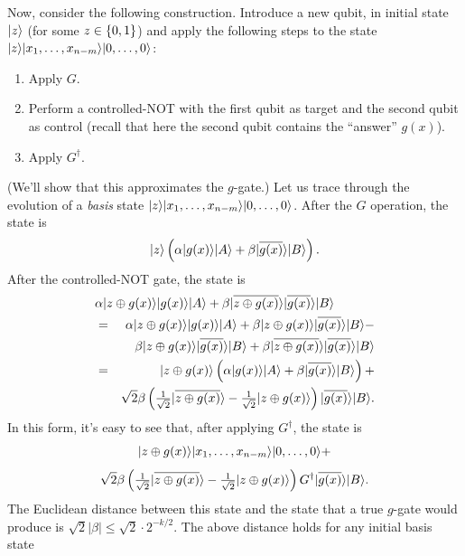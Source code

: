 Now, consider the following construction.
Introduce a new qubit, in initial state $\mbox{$| z \rangle$}$ (for some $z \in \01$) 
and apply the following steps to the state 
$\mbox{$| z \rangle$}\mbox{$| x_1,\ldots,x_{n-m} \rangle$}\mbox{$| 0,\ldots,0 \rangle$}$:
\begin{enumerate}
\item
Apply $G$.
\item
Perform a controlled-NOT with the first qubit as target and the second 
qubit as control (recall that here the second qubit contains the ``answer'' 
$g(x)$).
\item
Apply $G^{\dagger}$.
\end{enumerate}
(We'll show that this approximates the $g$-gate.)
Let us trace through the evolution of a {\em basis} state
$\mbox{$| z \rangle$}\mbox{$| x_1,\ldots,x_{n-m} \rangle$}\mbox{$| 0,\ldots,0 \rangle$}$.
After the $G$ operation, the state is 
\begin{equation}
\mbox{$| z \rangle$}\left(\alpha \mbox{$| g(x) \rangle$}\mbox{$| A \rangle$} 
+ \beta \mbox{$| \overline{g(x)} \rangle$}\mbox{$| B \rangle$}\right).
\end{equation}
After the controlled-NOT gate, the state is
\begin{eqnarray}
\lefteqn{\alpha \ket{z \oplus g(x)}\ket{g(x)}\ket{A} 
+ \beta \ket{\overline{z \oplus g(x)}}\ket{\overline{g(x)}}\ket{B}} & & 
\nonumber \\
& = & \alpha \ket{z \oplus g(x)}\ket{g(x)}\ket{A} 
+ \beta \ket{z \oplus g(x)}\ket{\overline{g(x)}}\ket{B} - \nonumber  \\
 & & \beta \ket{z \oplus g(x)}\ket{\overline{g(x)}}\ket{B}
+ \beta \ket{\overline{z \oplus g(x)}}\ket{\overline{g(x)}}\ket{B}
\nonumber \\
& = & \ket{z \oplus g(x)}
\left(\alpha \ket{g(x)}\ket{A} + \beta \ket{\overline{g(x)}}\ket{B}\right) +\\
\nonumber & & \sqrt{2}\beta
\left(\sqhalf\ket{\overline{z \oplus g(x)}} - \sqhalf\ket{z \oplus g(x)}\right)
\ket{\overline{g(x)}}\ket{B}.
\end{eqnarray}
In this form, it's easy to see that, after applying $G^{\dagger}$, the 
state is 
\begin{equation}
\mbox{$| z \oplus g(x) \rangle$}\mbox{$| x_1,\ldots,x_{n-m} \rangle$}\mbox{$| 0,\ldots,0 \rangle$} + 
\end{equation}
\[\sqrt{2}\beta
\left(\textstyle{1 \over \sqrt{2}}\mbox{$| \overline{z \oplus g(x)} \rangle$} - \textstyle{1 \over \sqrt{2}}\mbox{$| z \oplus g(x) \rangle$}\right)
G^{\dagger}\mbox{$| \overline{g(x)} \rangle$}\mbox{$| B \rangle$}.
\]
The Euclidean distance between this state and the state that a true 
$g$-gate would produce is 
$\sqrt{2}|\beta| \le \sqrt{2} \cdot 2^{-k/2}$.
The above distance holds for any initial basis state 
